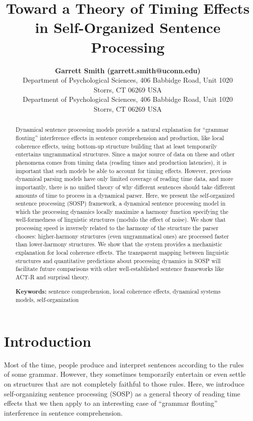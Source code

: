 \documentclass[10pt,letterpaper]{article}
\title{Toward a Theory of Timing Effects in Self-Organized Sentence Processing}
\author{{\large \bf Garrett Smith (garrett.smith@uconn.edu)} \\
  Department of Psychological Sciences, 406 Babbidge Road, Unit 1020\\
  Storrs, CT 06269 USA
  \AND {\large \bf Whitney Tabor (whitney.tabor@uconn.edu)} \\
  Department of Psychological Sciences, 406 Babbidge Road, Unit 1020\\
Storrs, CT 06269 USA}
\begin{document}
\maketitle

\begin{abstract}
Dynamical sentence processing models provide a natural explanation for ``grammar flouting'' interference effects in sentence comprehension and production, like local coherence effects, using bottom-up structure building that at least temporarily entertains ungrammatical structures. Since a major source of data on these and other phenomena comes from timing data (reading times and production latencies), it is important that such models be able to account for timing effects. However, previous dynamical parsing models have only limited coverage of reading time data, and more importantly, there is no unified theory of why different sentences should take different amounts of time to process in a dynamical parser. Here, we present the self-organized sentence processing (SOSP) framework, a dynamical sentence processing model in which the processing dynamics locally maximize a harmony function specifying the well-formedness of linguistic structures (modulo the effect of noise). We show that processing speed is inversely related to the harmony of the structure the parser chooses: higher-harmony structures (even ungrammatical ones) are processed faster than lower-harmony structures. We show that the system provides a mechanistic explanation for local coherence effects. The transparent mapping between linguistic structures and quantitative predictions about processing dynamics in SOSP will facilitate future comparisons with other well-established sentence frameworks like ACT-R and surprisal theory.

\textbf{Keywords:} sentence comprehension, local coherence effects, dynamical systems models, self-organization
\end{abstract}

\section{Introduction}
Most of the time, people produce and interpret sentences according to the rules of some grammar. However, they sometimes temporarily entertain or even settle on structures that are not completely faithful to those rules. Here, we introduce self-organizing sentence processing (SOSP) \cite{smith2018self} as a general theory of reading time effects that we then apply to an interesting case of ``grammar flouting'' interference in sentence comprehension.
\end{document}
